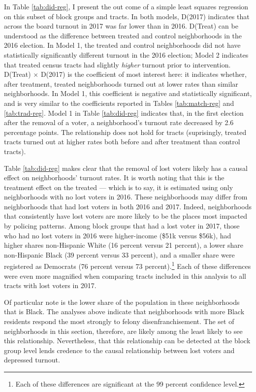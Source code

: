\documentclass[12pt,]{article}
\let\rmarkdownfootnote\footnote%
\def\footnote{\protect\rmarkdownfootnote}
\begin{document}
In Table \ref{tab:did-reg}, I present the out come of a simple least squares regression on this subset of block groups and tracts. In both models, D(2017) indicates that across the board turnout in 2017 was far lower than in 2016. D(Treat) can be understood as the difference between treated and control neighborhoods in the 2016 election. In Model 1, the treated and control neighborhoods did not have statistically significantly different turnout in the 2016 election; Model 2 indicates that treated census tracts had slightly \emph{higher} turnout prior to intervention. D(Treat) \(\times\) D(2017) is the coefficient of most interest here: it indicates whether, after treatment, treated neighborhoods turned out at lower rates than similar neighborhoods. In Model 1, this coefficient is negative and statistically significant, and is very similar to the coefficients reported in Tables \ref{tab:match-reg} and \ref{tab:trad-reg}. Model 1 in Table \ref{tab:did-reg} indicates that, in the first election after the removal of a voter, a neighborhood's turnout rate decreased by 2.6 percentage points. The relationship does not hold for tracts (suprisingly, treated tracts turned out at higher rates both before and after treatment than control tracts).



Table \ref{tab:did-reg} makes clear that the removal of lost voters likely has a causal effect on neighborhoods' turnout rates. It is worth noting that this is the treatment effect on the treated --- which is to say, it is estimated using only neighborhoods with no lost voters in 2016. These neighborhoods may differ from neighborhoods that had lost voters in both 2016 and 2017. Indeed, neighborhoods that consistently have lost voters are more likely to be the places most impacted by policing patterns. Among block groups that had a lost voter in 2017, those who had no lost voters in 2016 were higher-income (\$51k versus \$56k), had higher shares non-Hispanic White (16 percent versus 21 percent), a lower share non-Hispanic Black (39 percent versus 33 percent), and a smaller share were registered as Democrats (76 percent versus 73 percent).\footnote{Each of these differences are significant at the 99 percent confidence level.} Each of these differences were even more magnified when comparing tracts included in this analysis to all tracts with lost voters in 2017.

Of particular note is the lower share of the population in these neighborhoods that is Black. The analyses above indicate that neighborhoods with more Black residents respond the most strongly to felony disenfranchisement. The set of neighborhoods in this section, therefore, are likely among the least likely to see this relationship. Nevertheless, that this relationship can be detected at the block group level lends credence to the causal relationship between lost voters and depressed turnout.
\end{document}
